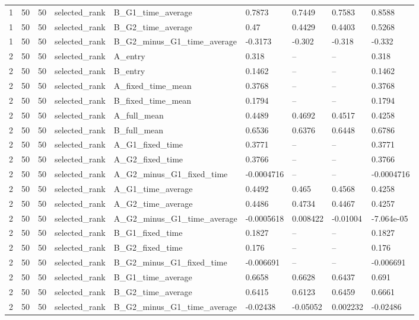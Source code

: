 \begin{longtable}{lllllllll}
1 & 50 & 50 & selected\_rank & B\_G1\_time\_average & 0.7873 & 0.7449 & 0.7583 & 0.8588 \\
1 & 50 & 50 & selected\_rank & B\_G2\_time\_average & 0.47 & 0.4429 & 0.4403 & 0.5268 \\
1 & 50 & 50 & selected\_rank & B\_G2\_minus\_G1\_time\_average & -0.3173 & -0.302 & -0.318 & -0.332 \\
2 & 50 & 50 & selected\_rank & A\_entry & 0.318 & -- & -- & 0.318 \\
2 & 50 & 50 & selected\_rank & B\_entry & 0.1462 & -- & -- & 0.1462 \\
2 & 50 & 50 & selected\_rank & A\_fixed\_time\_mean & 0.3768 & -- & -- & 0.3768 \\
2 & 50 & 50 & selected\_rank & B\_fixed\_time\_mean & 0.1794 & -- & -- & 0.1794 \\
2 & 50 & 50 & selected\_rank & A\_full\_mean & 0.4489 & 0.4692 & 0.4517 & 0.4258 \\
2 & 50 & 50 & selected\_rank & B\_full\_mean & 0.6536 & 0.6376 & 0.6448 & 0.6786 \\
2 & 50 & 50 & selected\_rank & A\_G1\_fixed\_time & 0.3771 & -- & -- & 0.3771 \\
2 & 50 & 50 & selected\_rank & A\_G2\_fixed\_time & 0.3766 & -- & -- & 0.3766 \\
2 & 50 & 50 & selected\_rank & A\_G2\_minus\_G1\_fixed\_time & -0.0004716 & -- & -- & -0.0004716 \\
2 & 50 & 50 & selected\_rank & A\_G1\_time\_average & 0.4492 & 0.465 & 0.4568 & 0.4258 \\
2 & 50 & 50 & selected\_rank & A\_G2\_time\_average & 0.4486 & 0.4734 & 0.4467 & 0.4257 \\
2 & 50 & 50 & selected\_rank & A\_G2\_minus\_G1\_time\_average & -0.0005618 & 0.008422 & -0.01004 & -7.064e-05 \\
2 & 50 & 50 & selected\_rank & B\_G1\_fixed\_time & 0.1827 & -- & -- & 0.1827 \\
2 & 50 & 50 & selected\_rank & B\_G2\_fixed\_time & 0.176 & -- & -- & 0.176 \\
2 & 50 & 50 & selected\_rank & B\_G2\_minus\_G1\_fixed\_time & -0.006691 & -- & -- & -0.006691 \\
2 & 50 & 50 & selected\_rank & B\_G1\_time\_average & 0.6658 & 0.6628 & 0.6437 & 0.691 \\
2 & 50 & 50 & selected\_rank & B\_G2\_time\_average & 0.6415 & 0.6123 & 0.6459 & 0.6661 \\
2 & 50 & 50 & selected\_rank & B\_G2\_minus\_G1\_time\_average & -0.02438 & -0.05052 & 0.002232 & -0.02486 \\

\end{longtable}
